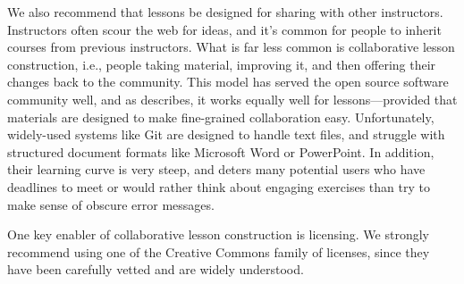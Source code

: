 \documentclass[10pt,letterpaper]{article}
\begin{document}
We also recommend that lessons be designed for sharing with other instructors.
Instructors often scour the web for ideas, and it's common for people to inherit
courses from previous instructors.  What is far less common is collaborative
lesson construction, i.e., people taking material, improving it, and then
offering their changes back to the community.  This model has served the open
source software community well, and as \cite{Deve2018} describes, it works
equally well for lessons---provided that materials are designed to make
fine-grained collaboration easy.  Unfortunately, widely-used systems like Git
are designed to handle text files, and struggle with structured document formats
like Microsoft Word or PowerPoint.  In addition, their learning curve is very
steep, and deters many potential users who have deadlines to meet or would
rather think about engaging exercises than try to make sense of obscure error
messages.

One key enabler of collaborative lesson construction is licensing.  We strongly
recommend using one of the Creative Commons family of licenses, since they have
been carefully vetted and are widely understood.

% 
\end{document}
